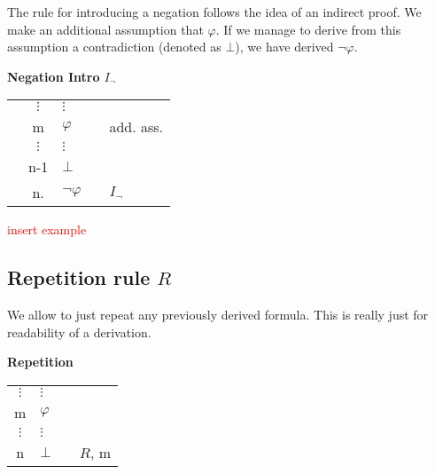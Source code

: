 \documentclass[nobib,nofonts]{tufte-handout}
\begin{document}
The rule for introducing a negation follows the idea of an indirect proof.
We make an additional assumption that $\varphi$.
If we manage to derive from this assumption a contradiction (denoted as $\bot$), we have derived $\neg \varphi$.

\bigskip
\noindent \colorbox{mygray!60}{\centering
  \begin{minipage}[t]{0.35\linewidth}
    \textbf{Negation Intro $I_{\neg}$}
  \end{minipage}
  \begin{minipage}[t]{0.55\linewidth}
    \begin{tabular}{cclcl}
                         &                   $\vdots$ & $\vdots$       & \\
      \cline{1-2} \vline & m                          & $\varphi$      & & add. ass.  \\
      \vline             &                   $\vdots$ & $\vdots$       & \\
      \vline             & n-1                        & $\bot$         & & \\ \hline
                         & n.                         & $\neg \varphi$ & & $I_{\neg}$
    \end{tabular}
  \end{minipage}
}
\bigskip

\textcolor{red}{insert example}

\subsection{Repetition rule $R$}

We allow to just repeat any previously derived formula.
This is really just for readability of a derivation.

\bigskip
\noindent \colorbox{mygray!60}{\centering
  \begin{minipage}[t]{0.35\linewidth}
    \textbf{Repetition}
  \end{minipage}
  \begin{minipage}[t]{0.55\linewidth}
    \begin{tabular}{clcl}
            $\vdots$ & $\vdots$  & \\
      m              & $\varphi$ &  \\
            $\vdots$ & $\vdots$  & \\
      n              & $\bot$    & & $R$, m
    \end{tabular}
  \end{minipage}
}
\bigskip
\end{document}
